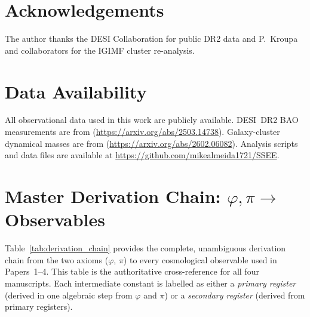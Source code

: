\documentclass[12pt,a4paper]{article}
\begin{document}
\section*{Acknowledgements}

The author thanks the DESI Collaboration for public DR2 data and
P.~Kroupa and collaborators for the IGIMF cluster re-analysis.

\section*{Data Availability}

All observational data used in this work are publicly available.
DESI~DR2 BAO measurements are from \citet{AbdulKarim2025}
(\url{https://arxiv.org/abs/2503.14738}).
Galaxy-cluster dynamical masses are from \citet{Zhang2026}
(\url{https://arxiv.org/abs/2602.06082}).
Analysis scripts and data files are available at
\url{https://github.com/mikealmeida1721/SSEE}.


\appendix

\section{Master Derivation Chain: $\varphi,\pi \to$ Observables}
\label{app:derivation_chain}

Table~\ref{tab:derivation_chain} provides the complete, unambiguous
derivation chain from the two axioms ($\varphi$, $\pi$) to every
cosmological observable used in Papers~1--4.
This table is the authoritative cross-reference for all four manuscripts.
Each intermediate constant is labelled as either a \textit{primary register}
(derived in one algebraic step from $\varphi$ and $\pi$) or a
\textit{secondary register} (derived from primary registers).
\end{document}
